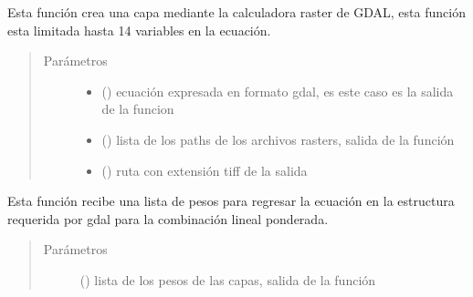 \documentclass[letterpaper,10pt,spanish]{sphinxmanual}
\begin{document}
\begin{fulllineitems}
\label{\detokenize{analisis:sensibilidad_por_remocion_capas.crea_capa}}
Esta función crea una capa mediante la calculadora raster
de GDAL, esta función esta limitada hasta 14 variables en la ecuación.
\begin{quote}\begin{description}
\item[{Parámetros}] \leavevmode\begin{itemize}
\item {} 
 () \textendash{} ecuación expresada en formato gdal,                    es este caso es la salida de la funcion 

\item {} 
 () \textendash{} lista de los paths de los archivos rasters, salida de la función 

\item {} 
 () \textendash{} ruta con extensión tiff de la salida

\end{itemize}

\end{description}\end{quote}

\end{fulllineitems}


\begin{fulllineitems}
\label{\detokenize{analisis:sensibilidad_por_remocion_capas.ecuacion_clp}}
Esta función recibe una lista de pesos para regresar la ecuación
en la estructura requerida por gdal para la combinación lineal ponderada.
\begin{quote}\begin{description}
\item[{Parámetros}] \leavevmode
{} () \textendash{} lista de los pesos de las capas, salida de la función 

\end{description}\end{quote}

\end{fulllineitems}
\end{document}
